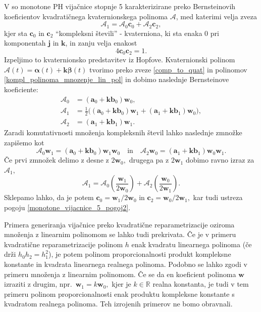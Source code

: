 \documentclass[12pt,a4paper,twoside]{article}
\theoremstyle{definition} %
\theoremstyle{plain} %
\theoremstyle{primerstyle}
\numberwithin{equation}{section}  %
\newcommand{\R}{\mathbb R}
\newcommand{\aV}{\mathbf{a}}
\newcommand{\bV}{\mathbf{b}}
\newcommand{\cV}{\mathbf{c}}
\newcommand{\jV}{\mathbf{j}}
\newcommand{\kV}{\mathbf{k}}
\newcommand{\wV}{\mathbf{w}}
\newcommand{\AQ}{\mathcal{A}}
\newcommand{\balpha}{\boldsymbol \alpha}
\newcommand{\bbeta}{\boldsymbol \beta}
\begin{document}
V \cite[str.\ 390]{faroukietal2004} so monotone PH vijačnice stopnje 5 karakterizirane preko Bernsteinovih koeficientov kvadratičnega kvaternionskega polinoma $\AQ$, med katerimi velja zveza
\begin{equation}
	\label{monotone_vijacnice_5_pogoj}
	\AQ_1=\AQ_0\cV_0+\AQ_2\cV_2,
\end{equation}
kjer sta $\cV_0$ in $\cV_2$ ``kompleksni števili'' - kvaterniona, ki sta enaka 0 pri komponentah $\jV$ in $\kV$, in zanju velja enakost
\begin{equation}
	\label{monotone_vijacnice_5_pogoj2}
	4\cV_0\cV_2=1.
\end{equation}
Izpeljimo to kvaternionsko predstavitev iz Hopfove. Kvaternionski polinom $\AQ(t)=\balpha(t)+\kV\bbeta(t)$ tvorimo preko zveze \eqref{comp_to_quat} in polinomov \eqref{kompl_polinoma_mnozenje_lin_pol} in dobimo naslednje Bernsteinove koeficiente:
\begin{align*}
	\AQ_0&=(\aV_0+\kV\bV_0)\wV_0,\\
	\AQ_1&=\frac{1}{2}\big((\aV_0+\kV\bV_0)\wV_1+(\aV_1+\kV\bV_1)\wV_0\big),\\
	\AQ_2&=(\aV_1+\kV\bV_1)\wV_1.
\end{align*}
Zaradi komutativnosti množenja kompleksnih števil lahko naslednje zmnožke zapišemo kot
\begin{equation*}
	\AQ_0\wV_1=(\aV_0+\kV\bV_0)\wV_1\wV_0\quad\text{in}\quad\AQ_2\wV_0=(\aV_1+\kV\bV_1)\wV_0\wV_1.
\end{equation*}
Če prvi zmnožek delimo z desne z $2\wV_0,$ drugega pa z $2\wV_1$ dobimo ravno izraz za $\AQ_1,$
\begin{equation*}
	\AQ_1=\AQ_0\left(\frac{\wV_1}{2\wV_0}\right)+\AQ_2\left(\frac{\wV_0}{2\wV_1}\right).
\end{equation*}
Sklepamo lahko, da je potem $\cV_0=\wV_1/2\wV_0$ in $\cV_2=\wV_0/2\wV_1,$ kar tudi ustreza pogoju \eqref{monotone_vijacnice_5_pogoj2}.

Primera generiranja vijačnice preko kvadratične reparametrizacije oziroma množenja z linearnim polinomom se lahko tudi prekrivata. Če je v primeru kvadratične reparametrizacije polinom $h$ enak kvadratu linearnega polinoma (če drži $h_0h_2=h_1^2$), je potem polinom proporcionalnosti produkt kompleksne konstante in kvadrata linearnega realnega polinoma. Podobno se lahko zgodi v primeru množenja z linearnim polinomom. Če se da en koeficient polinoma $\wV$ izraziti z drugim, npr.\ $\wV_1=k\wV_0,$ kjer je $k\in\R$ realna konstanta, je tudi v tem primeru polinom proporcionalnosti enak produktu kompleksne konstante s kvadratom realnega polinoma. Teh izrojenih primerov ne bomo obravnali.
\end{document}
